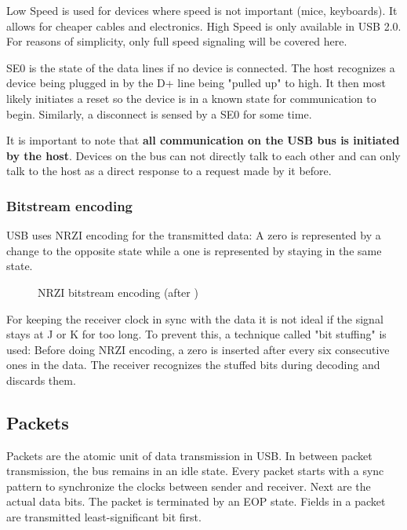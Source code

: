\documentclass{article}
\begin{document}
\pagebreak
Low Speed is used for devices where speed is not important (mice, keyboards).
It allows for cheaper cables and electronics. High Speed is only available
in USB 2.0. For reasons of simplicity, only full speed signaling will be covered
here. \cite[p. 12]{usbstd}

SE0 is the state of the data lines if no device is connected. The host
recognizes a device being plugged in by the D+ line being "pulled up" to high.
It then most likely initiates a reset so the device is in a known state for
communication to begin. Similarly, a disconnect is sensed by a SE0 for some time.
\cite[p. 149]{usbstd}

It is important to note that {\bf all communication on the USB bus is initiated by the
host}. Devices on the bus can not directly talk to each other and can only talk
to the host as a direct response to a request made by it before.
\cite[p. 27]{usbstd}

\subsubsection{Bitstream encoding}

USB uses NRZI encoding for the transmitted data: A zero is represented by a change to
the opposite state while a one is represented by staying in the same state.

\begin{figure}[H]
  \caption{NRZI bitstream encoding (after \cite[p. 157]{usbstd})}
  \centering
  \scalebox{0.35}{}
\end{figure}

For keeping the receiver clock in sync with the data it is not ideal if the signal
stays at J or K for too long. To prevent this, a technique called "bit stuffing"
is used: Before doing NRZI encoding, a zero is inserted after every six consecutive ones
in the data. The receiver recognizes the stuffed bits during decoding and discards them.
\cite[p. 157]{usbstd}

\subsection {Packets}

Packets are the atomic unit of data transmission in USB. In between packet transmission,
the bus remains in an idle state. Every packet starts with a sync pattern to synchronize
the clocks between sender and receiver. Next are the actual data bits. The packet is
terminated by an EOP state. Fields in a packet are transmitted least-significant
bit first. \cite[p. 195]{usbstd}
\end{document}
